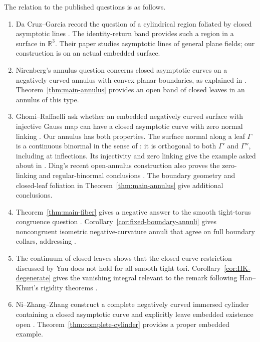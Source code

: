 \documentclass[11pt]{amsart}
\theoremstyle{definition}
\theoremstyle{remark}
\newcommand{\R}{\mathbb R}\newcommand{\Sph}{\mathbb S}
\numberwithin{equation}{section}
\begin{document}
The relation to the published questions is as follows.
\begin{enumerate}[label=\textup{(\roman*)}]
\item Da Cruz--Garcia record the question of a cylindrical region
foliated by closed asymptotic lines \cite[p.~17]{DaCruzGarcia}.
The identity-return band provides such a region in a surface in $\R^3$.
Their paper studies asymptotic lines of general plane fields; our
construction is on an actual embedded surface.
\item Nirenberg's annulus question concerns closed asymptotic curves
on a negatively curved annulus with convex planar boundaries, as
explained in \cite[\S1.2]{GhomiProblems}. Theorem~\ref{thm:main-annulus}
provides an open band of closed leaves in an annulus of this type.
\item Ghomi--Raffaelli ask whether an embedded negatively curved
surface with injective Gauss map can have a closed asymptotic curve
with zero normal linking \cite[Problem~1.1]{GR}. Our annulus has both
properties. The surface normal along a leaf $\Gamma$ is a continuous
binormal in the sense of \cite[\S1.2]{GhomiProblems}: it is orthogonal
to both $\Gamma'$ and $\Gamma''$, including at inflections. Its
injectivity and zero linking give the example asked about in
\cite[Problem~1.4]{GhomiProblems}.
Ding's recent open-annulus construction also proves the zero-linking
and regular-binormal conclusions \cite[Theorem~1.1 and
Corollary~1.2]{Ding2026}. The boundary geometry and closed-leaf
foliation in Theorem~\ref{thm:main-annulus} give additional conclusions.
\item Theorem~\ref{thm:main-fiber} gives a negative answer to the
smooth tight-torus congruence question \cite[Question~11]{BK}.
Corollary~\ref{cor:fixed-boundary-annuli} gives noncongruent isometric
negative-curvature annuli that agree on full boundary collars,
addressing \cite[Problem~1.3]{GhomiProblems}.
\item The continuum of closed leaves shows that the closed-curve
restriction discussed by Yau \cite[p.~236]{YauReview} does not hold
for all smooth tight tori. Corollary~\ref{cor:HK-degenerate} gives the
vanishing integral relevant to the remark following Han--Khuri's
rigidity theorems \cite[p.~464]{HK}.
\item Ni--Zhang--Zhang construct a complete negatively curved immersed
cylinder containing a closed asymptotic curve and explicitly leave
embedded existence open \cite[Theorem~3.4 and the following paragraph]{NiZhangZhang}.
Theorem~\ref{thm:complete-cylinder} provides a proper embedded example.
\end{enumerate}
\end{document}
